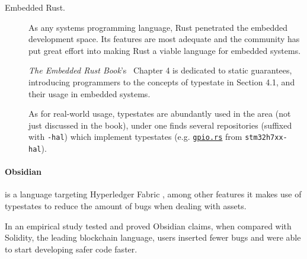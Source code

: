 \begin{description}
    \item[Embedded Rust.] As any systems programming language, Rust penetrated the embedded development space.
          Its features are most adequate and the community has put great effort into making Rust a viable language for embedded systems.

          \emph{The Embedded Rust Book}'s~\autocite{Rust2021} Chapter 4 is dedicated to static guarantees,
          introducing programmers to the concepts of typestate in Section 4.1, and their usage in embedded systems.

          As for real-world usage, typestates are abundantly used in the area (not just discussed in the book),
          under \autocite{Stm32} one finds several repositories (suffixed with \texttt{-hal})
          which implement typestates
          (e.g. \href{https://github.com/stm32-rs/stm32h7xx-hal/blob/master/src/gpio.rs#L51-L128}{\texttt{gpio.rs}}
          from \texttt{stm32h7xx-hal}).
\end{description}

\paragraph{Obsidian} is a language targeting Hyperledger Fabric \autocite{Fabric2021},
among other features it makes use of typestates to reduce the amount of bugs when dealing with assets.

In \autocite{Coblenz2020} an empirical study tested and proved Obsidian claims,
when compared with Solidity, the leading blockchain language,
users inserted fewer bugs and were able to start developing safer code faster.

